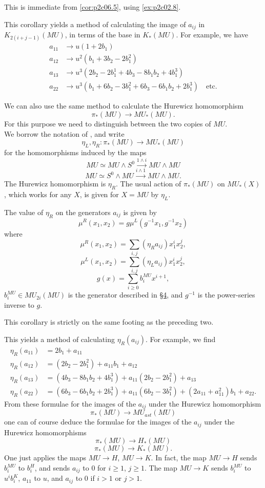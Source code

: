 \documentclass[../main]{subfiles}
\begin{document}
This is immediate from \eqref{cor:p2c06.5}, using \eqref{ex:p2c02.8}.

This corollary yields a method of calculating the image of $a_{ij}$ in $K_{2(i+j-1)}(MU)$, in terms of the base in $K_\ast(MU)$. For example, we have 
\begin{align*}
    a_{11} &\longrightarrow u(1+2b_1)  \\
    a_{12} &\longrightarrow u^2(b_1+3b_2-2b_1^2)  \\ 
    a_{13} &\longrightarrow u^3(2b_2-2b_1^1+4b_3-8b_1b_2+4b_1^3)  \\
    a_{22} &\longrightarrow u^3(b_1+6b_2-3b_1^2+6b_3-6b_1b_2+2b_1^3) \quad \text{etc.} 
\end{align*}

We can also use the same method to calculate the Hurewicz homomorphism
$$\pi_\ast(MU)\longrightarrow MU_\ast(MU).$$
For this purpose we need to distinguish between the two copies of $MU$.\\
We borrow the notation of \cite{adams3}, and write
$$\eta_L,\eta_R:\pi_\ast(MU)\longrightarrow MU_\ast(MU)$$
for the homomorphisms induced by the maps
$$MU\simeq MU\wedge S^0\overset{1\wedge i}{\longrightarrow} MU\wedge MU$$
$$MU\simeq S^0\wedge MU\overset{i\wedge 1}{\longrightarrow} MU\wedge MU.$$
The Hurewicz homomorphism is $\eta_R$. The usual action of $\pi_\ast(MU)$ on $MU_\ast(X)$, which works for any $X$, is given for $X=MU$ by $\eta_L$.
\begin{corollary}
\label{cor:p2c06.8}
The value of $\eta_R$ on the generators $a_{ij}$ is given by 
$$\mu^R(x_1,x_2)=g\mu^L\left(g^{-1}x_1,g^{-1}x_2\right)$$
where 
$$\mu^R(x_1,x_2)=\sum_{i,j}(\eta_Ra_{ij})x_1^ix_2^j,$$
$$\mu^L(x_1,x_2)=\sum_{i,j}(\eta_La_{ij})x_1^ix_2^j,$$
$$g(x)=\sum_{i\geq 0}b_i^{MU}x^{i+1},$$
$b_i^{MU}\in MU_{2i}(MU)$ is the generator described in \hyperref[sec:p2c4]{\S 4}, and $g^{-1}$ is the power-series inverse to $g$.
\end{corollary}

This corollary is strictly on the same footing as the preceding two.

This yields a method of calculating $\eta_R(a_{ij})$. For example, we find
\begin{align*}
    \eta_R(a_{11})&=2b_1+a_{11} \\ 
    \eta_R(a_{12})&=(2b_2-2b_1^2)+a_{11}b_1 + a_{12 } \\ 
    \eta_R(a_{13})&=(4b_3-8b_1b_2+4b_1^3)+a_{11}(2b_2-2b_1^2) + a_{13} \\ 
    \eta_R(a_{22})&=(6b_3-6b_1b_2+2b_1^3)+a_{11}(6b_2-3b_1^2) + (2a_{11}+a_{11}^2)b_1+a_{22}. 
\end{align*}
From these formulae for the images of the $a_{ij}$ under the Hurewicz homomorphism
$$\pi_\ast(MU)\longrightarrow MU_{ast}(MU)$$
one can of course deduce the formulae for the images of the $a_{ij}$ under the Hurewicz homomorphisms
$$\pi_\ast(MU)\longrightarrow H_\ast(MU)$$
$$\pi_\ast(MU)\longrightarrow K_\ast(MU).$$
One just applies the maps $MU\longrightarrow H$, $MU\longrightarrow K$. In fact, the map $MU\longrightarrow H$ sends $b_i^{MU}$ to $b_i^H$, and sends $a_{ij}$ to $0$ for $i\geq 1$, $j\geq 1$. The map $MU\longrightarrow K$ sends $b_i^{MU}$ to $u^ib_i^K$, $a_{11}$ to $u$, and $a_{ij}$ to $0$ if $i>1$ or $j>1$.
\end{document}

